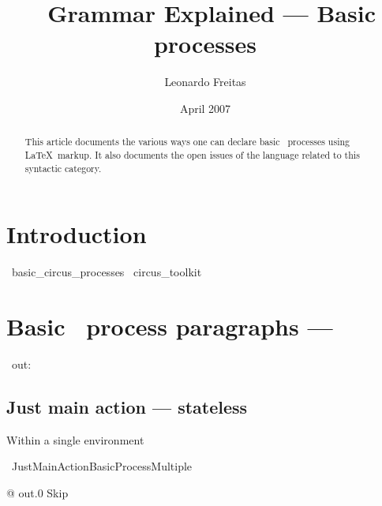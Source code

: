 \documentclass{article}
\begin{document}
\title{\Circus\ Grammar Explained --- Basic processes}
\author{Leonardo Freitas}
\date{April 2007}

\maketitle

\begin{abstract}
    \noindent This article documents the various ways one can declare basic \Circus\ processes using \LaTeX\ markup.
    It also documents the open issues of the language related to this syntactic category.
\end{abstract}

\section{Introduction}

\begin{zsection}
  \SECTION\ basic\_circus\_processes \parents\ circus\_toolkit
\end{zsection}

\section{Basic \Circus\ process paragraphs --- }

\begin{circus}
    \circchannel\ out: \nat
\end{circus}

\subsection{Just main action --- stateless}

Within a single environment
%
\begin{circus}
    \circprocess\ JustMainActionBasicProcessMultiple ~~\circdef~~ \circbegin
\end{circus}

\begin{circusaction}
    @ out.0 \then Skip
\end{circusaction}
\end{document}
